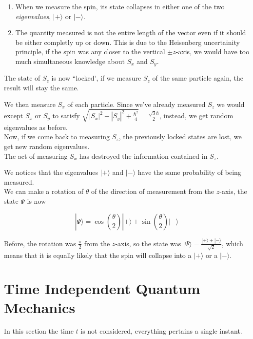 \documentclass[a4paper]{article}
\begin{document}
\begin{enumerate}
    \item When we measure the spin, its state collapses in either one of the two \textit{eigenvalues}, \(|+\rangle\) or \(|-\rangle\).
    \item The quantity measured is not the entire length of the vector even if it should be either completly up or down.
        This is due to the Heisenberg uncertainity principle, if the spin was any closer to the vertical \(\pm z\)-axis,
        we would have too much simultaneous knowledge about \(S_x\) and \(S_y\).
\end{enumerate}

The state of \(S_z\) is now ``locked', if we measure \(S_z\) of the same particle again, the result will stay the same.

We then measure \(S_x\) of each particle. Since we've already measured \(S_z\) we would except \(S_x\) or \(S_y\)
to satisfy \(\sqrt{{|S_x|}^2 + {|S_y|}^2 + \frac{\hbar^2}{4}} = \frac{\sqrt{3}\hbar}{2}\), instead, we get random eigenvalues as before. \\
Now, if we come back to measuring \(S_z\), the previously locked states are lost, we get new random eigenvalues. \\
The act of measuring \(S_x\) has destroyed the information contained in \(S_z\).

We notices that the eigenvalues \(|+\rangle\) and \(|-\rangle\) have the same probability of being measured. \\
We can make a rotation of \(\theta\) of the direction of measurement from the \(z\)-axis, the state \(\Psi\) is now

\[
    |\Psi\rangle = \cos\left(\frac{\theta}{2}\right) |+\rangle + \sin\left(\frac{\theta}{2}\right)|-\rangle
\]

Before, the rotation was \(\frac{\pi}{2}\) from the \(z\)-axis, so the state was \(|\Psi\rangle=\frac{|+\rangle + |-\rangle}{\sqrt{2}}\),
which means that it is equally likely that the spin will collapse into a \(|+\rangle\) or a \(|-\rangle\).

\pagebreak

\section{Time Independent Quantum Mechanics}

In this section the time \(t\) is not considered, everything pertains a single instant.
\end{document}
